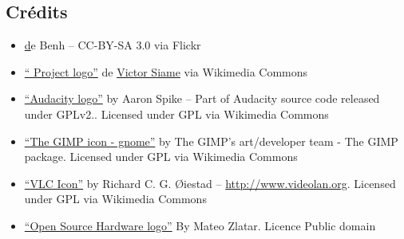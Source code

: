 
\subsection{Crédits}

\begin{itemize}[label=$\bullet$]

\item \href{https://www.flickr.com/photos/blieusong/6986608500/in/set-72157629942158013} de {Benh  -- CC-BY-SA 3.0} via Flickr

\item \href{https://commons.wikimedia.org/wiki/File\%3AOfficial_gnu.svg"><img width="512" alt="Official gnu" src="//upload.wikimedia.org/wikipedia/commons/thumb/3/39/Official_gnu.svg/512px-Official_gnu.svg.png}{“ Project logo”} de \href{mailto:vcopovi@wanadoo.fr}{Victor Siame} via Wikimedia Commons

\item \href{https://commons.wikimedia.org/wiki/File:Audacity_Logo.svg#/media/File:Audacity_Logo.svg}{“Audacity logo”} 
by Aaron Spike -- Part of Audacity source code 
released under GPLv2.. Licensed under GPL via Wikimedia Commons

\item \href{https://commons.wikimedia.org/wiki/File:The_GIMP_icon_-_gnome.svg#/media/File:The_GIMP_icon_-_gnome.svg}{“The GIMP icon - gnome”} 
by The GIMP's art/developer team - The 
GIMP package. Licensed under GPL via Wikimedia Commons

\item \href{https://commons.wikimedia.org/wiki/File:VLC_Icon.svg#/media/File:VLC_Icon.svg}{“VLC Icon”} 
by Richard C. G. Øiestad -- \url{http://www.videolan.org}. 
Licensed under GPL via Wikimedia Commons

\item \href{http://www.oshwa.org/open-source-hardware-logo}{“Open Source Hardware logo”} By Mateo Zlatar. Licence Public domain

\end{itemize}
